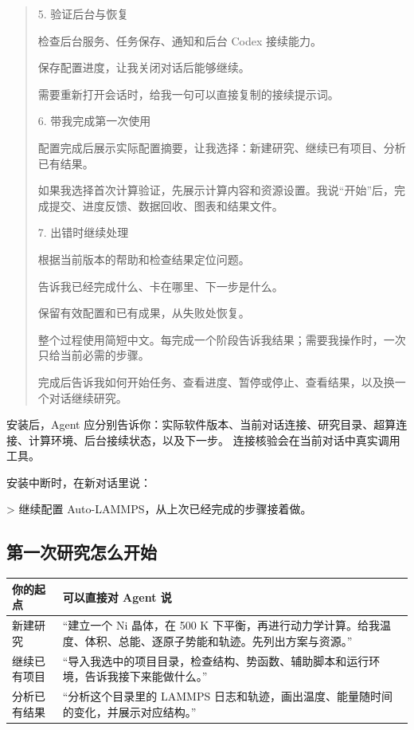 \documentclass[11pt,a4paper]{ctexart}
\begin{document}
\begin{quote}
5. 验证后台与恢复\par
检查后台服务、任务保存、通知和后台 Codex 接续能力。\par
保存配置进度，让我关闭对话后能够继续。\par
需要重新打开会话时，给我一句可以直接复制的接续提示词。\par


6. 带我完成第一次使用\par
配置完成后展示实际配置摘要，让我选择：新建研究、继续已有项目、分析已有结果。\par
如果我选择首次计算验证，先展示计算内容和资源设置。我说“开始”后，完成提交、进度反馈、数据回收、图表和结果文件。\par


7. 出错时继续处理\par
根据当前版本的帮助和检查结果定位问题。\par
告诉我已经完成什么、卡在哪里、下一步是什么。\par
保留有效配置和已有成果，从失败处恢复。\par


整个过程使用简短中文。每完成一个阶段告诉我结果；需要我操作时，一次只给当前必需的步骤。\par
完成后告诉我如何开始任务、查看进度、暂停或停止、查看结果，以及换一个对话继续研究。\par
\end{quote}


安装后，Agent 应分别告诉你：实际软件版本、当前对话连接、研究目录、超算连接、计算环境、后台接续状态，以及下一步。 连接核验会在当前对话中真实调用工具。



安装中断时，在新对话里说：



> 继续配置 Auto-LAMMPS，从上次已经完成的步骤接着做。



\subsection{第一次研究怎么开始}


\begin{longtable}{p{7.25cm}p{7.25cm}}
\toprule
你的起点 & 可以直接对 Agent 说 \\
\midrule\endhead
新建研究 & “建立一个 Ni 晶体，在 500 K 下平衡，再进行动力学计算。给我温度、体积、总能、逐原子势能和轨迹。先列出方案与资源。” \\
继续已有项目 & “导入我选中的项目目录，检查结构、势函数、辅助脚本和运行环境，告诉我接下来能做什么。” \\
分析已有结果 & “分析这个目录里的 LAMMPS 日志和轨迹，画出温度、能量随时间的变化，并展示对应结构。” \\
\bottomrule
\end{longtable}
\end{document}
